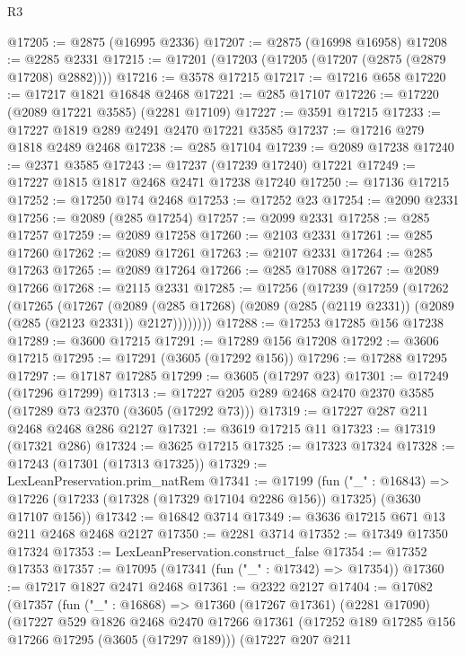 \begin{lexlean}{R3}
\begin{coremodule}
@17205 := @2875 (@16995 @2336)
@17207 := @2875 (@16998 @16958)
@17208 := @2285 @2331
@17215 := @17201 (@17203 (@17205 (@17207 (@2875 (@2879 @17208) @2882))))
@17216 := @3578 @17215
@17217 := @17216 @658
@17220 := @17217 @1821 @16848 @2468
@17221 := @285 @17107
@17226 := @17220 (@2089 @17221 @3585) (@2281 @17109)
@17227 := @3591 @17215
@17233 := @17227 @1819 @289 @2491 @2470 @17221 @3585
@17237 := @17216 @279 @1818 @2489 @2468
@17238 := @285 @17104
@17239 := @2089 @17238
@17240 := @2371 @3585
@17243 := @17237 (@17239 @17240) @17221
@17249 := @17227 @1815 @1817 @2468 @2471 @17238 @17240
@17250 := @17136 @17215
@17252 := @17250 @174 @2468
@17253 := @17252 @23
@17254 := @2090 @2331
@17256 := @2089 (@285 @17254)
@17257 := @2099 @2331
@17258 := @285 @17257
@17259 := @2089 @17258
@17260 := @2103 @2331
@17261 := @285 @17260
@17262 := @2089 @17261
@17263 := @2107 @2331
@17264 := @285 @17263
@17265 := @2089 @17264
@17266 := @285 @17088
@17267 := @2089 @17266
@17268 := @2115 @2331
@17285 := @17256
    (@17239
      (@17259
        (@17262
          (@17265
            (@17267
              (@2089
                (@285 @17268)
                (@2089 (@285 (@2119 @2331)) (@2089 (@285 (@2123 @2331)) @2127))))))))
@17288 := @17253 @17285 @156 @17238
@17289 := @3600 @17215
@17291 := @17289 @156 @17208
@17292 := @3606 @17215
@17295 := @17291 (@3605 (@17292 @156))
@17296 := @17288 @17295
@17297 := @17187 @17285
@17299 := @3605 (@17297 @23)
@17301 := @17249 (@17296 @17299)
@17313 := @17227 @205 @289 @2468 @2470 @2370 @3585 (@17289 @73 @2370 (@3605 (@17292 @73)))
@17319 := @17227 @287 @211 @2468 @2468 @286 @2127
@17321 := @3619 @17215 @11
@17323 := @17319 (@17321 @286)
@17324 := @3625 @17215
@17325 := @17323 @17324
@17328 := @17243 (@17301 (@17313 @17325))
@17329 := LexLeanPreservation.prim_natRem
@17341 := @17199
    (fun ("_" : @16843) =>
    @17226 (@17233 (@17328 (@17329 @17104 @2286 @156)) @17325) (@3630 @17107 @156))
@17342 := @16842 @3714
@17349 := @3636 @17215 @671 @13 @211 @2468 @2468 @2127
@17350 := @2281 @3714
@17352 := @17349 @17350 @17324
@17353 := LexLeanPreservation.construct_false
@17354 := @17352 @17353
@17357 := @17095 (@17341 (fun ("_" : @17342) => @17354))
@17360 := @17217 @1827 @2471 @2468
@17361 := @2322 @2127
@17404 := @17082
    (@17357
      (fun ("_" : @16868) =>
      @17360
        (@17267 @17361)
        (@2281 @17090)
        (@17227
          @529
          @1826
          @2468
          @2470
          @17266
          @17361
          (@17252 @189 @17285 @156 @17266 @17295 (@3605 (@17297 @189)))
          (@17227
            @207
            @211

\end{coremodule}
\end{lexlean}
